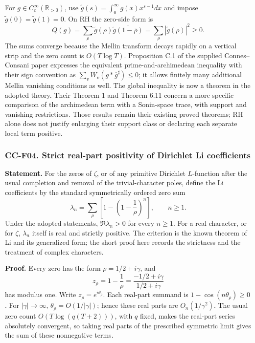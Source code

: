 \documentclass[11pt,a4paper]{article}
\theoremstyle{definition}\newtheorem{definition}[theorem]{Definition}
\theoremstyle{remark}\newtheorem{remark}[theorem]{Remark}
\begin{document}
For \(g\in C_c^\infty(\mathbb R_{>0})\), use
\(\widetilde g(s)=\int_0^\infty g(x)x^{s-1}dx\) and impose
\(\widetilde g(0)=\widetilde g(1)=0\). On RH the zero-side form is \[
 Q(g)=\sum_\rho\widetilde g(\rho)
       \overline{\widetilde g(1-\overline\rho)}
     =\sum_\rho|\widetilde g(\rho)|^2\ge0.
\] The sums converge because the Mellin transform decays rapidly on a
vertical strip and the zero count is \(O(T\log T)\). Proposition C.1 of
the supplied Connes--Consani paper expresses the equivalent
prime-and-archimedean inequality with their sign convention as
\(\sum_v W_v(g*\overline g^{\sharp})\le0\); it allows finitely many
additional Mellin vanishing conditions as well. The global inequality is
now a theorem in the adopted theory. Their Theorem 1 and Theorem 6.11
concern a more specific comparison of the archimedean term with a
Sonin-space trace, with support and vanishing restrictions. Those
results remain their existing proved theorems; RH alone does not justify
enlarging their support class or declaring each separate local term
positive.

\subsubsection{CC-F04. Strict real-part positivity of Dirichlet Li
coefficients}\label{cc-f04.-strict-real-part-positivity-of-dirichlet-li-coefficients}

\textbf{Statement.} For the zeros of \(\zeta\), or of any primitive
Dirichlet \(L\)-function after the usual completion and removal of the
trivial-character poles, define the Li coefficients by the standard
symmetrically ordered zero sum \[
 \lambda_n=\sum_\rho\left[1-\left(1-\frac1\rho\right)^n\right],\qquad n\ge1.
\] Under the adopted statements, \(\Re\lambda_n>0\) for every \(n\ge1\).
For a real character, or for \(\zeta\), \(\lambda_n\) itself is real and
strictly positive. The criterion is the known theorem of Li and its
generalized form; the short proof here records the strictness and the
treatment of complex characters.

\textbf{Proof.} Every zero has the form \(\rho=1/2+i\gamma\), and \[
 z_\rho=1-\frac1\rho=\frac{-1/2+i\gamma}{1/2+i\gamma}
\] has modulus one. Write \(z_\rho=e^{i\theta_\rho}\). Each real-part
summand is \(1-\cos(n\theta_\rho)\ge0\). For \(|\gamma|\to\infty\),
\(\theta_\rho=O(1/|\gamma|)\); hence these real parts are
\(O_n(1/\gamma^2)\). The usual zero count \(O(T\log(q(T+2)))\), with
\(q\) fixed, makes the real-part series absolutely convergent, so taking
real parts of the prescribed symmetric limit gives the sum of these
nonnegative terms.
\end{document}
